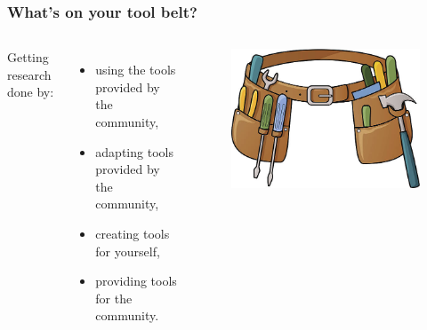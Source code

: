 \documentclass[aspectratio=169]{beamer}
\begin{document}
\begin{frame}
  \frametitle{What's on your tool belt?}

  \begin{columns}[c]

    {\Huge Getting research done by:}
    \begin{itemize}
      \item using the tools provided by the community,
      \item adapting tools provided by the community,
      \item creating tools for yourself,
      \item providing tools for the community.
    \end{itemize}

    \vspace{2em}


    \begin{figure}
      \centering
      \includegraphics[width=1.0\textwidth]{./fig/tool_belt.jpg}
    \end{figure}

  \end{columns}

\end{frame}

\end{document}
